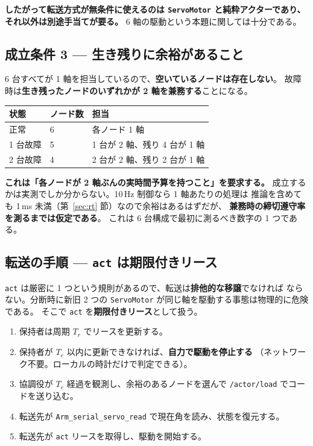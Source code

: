 \documentclass[11pt,a4paper]{article}
\newcommand{\code}[1]{\texttt{#1}}
\newcommand{\prob}[1]{\textbf{\textcolor{red!55!black}{#1}}}
\begin{document}
\textbf{したがって転送方式が無条件に使えるのは \code{ServoMotor} と純粋アクターであり、
それ以外は別途手当てが要る。} 6 軸の駆動という本題に関しては十分である。

\subsection{成立条件 3 --- 生き残りに余裕があること}

6 台すべてが 1 軸を担当しているので、\textbf{空いているノードは存在しない}。
故障時は\textbf{生き残ったノードのいずれかが 2 軸を兼務する}ことになる。

\begin{center}
\begin{tabular}{@{}l l l@{}}
\toprule
\textbf{状態} & \textbf{ノード数} & \textbf{担当}\\
\midrule
正常 & 6 & 各ノード 1 軸\\
1 台故障 & 5 & 1 台が 2 軸、残り 4 台が 1 軸\\
2 台故障 & 4 & 2 台が 2 軸、残り 2 台が 1 軸\\
\bottomrule
\end{tabular}
\end{center}

\prob{これは「各ノードが 2 軸ぶんの実時間予算を持つこと」を要求する。}
成立するかは実測でしか分からない。10\,Hz 制御なら 1 軸あたりの処理は
推論を含めても 1\,ms 未満（第~\ref{sec:rt} 節）なので余裕はあるはずだが、
\textbf{兼務時の締切遵守率を測るまでは仮定である}。
これは 6 台構成で最初に測るべき数字の 1 つである。

\subsection{転送の手順 --- \code{act} は期限付きリース}

\code{act} は厳密に 1 つという規則があるので、転送は\textbf{排他的な移譲}でなければ
ならない。分断時に新旧 2 つの \code{ServoMotor} が同じ軸を駆動する事態は物理的に危険である。
そこで \code{act} を\textbf{期限付きリース}として扱う。

\begin{enumerate}[leftmargin=1.6em,itemsep=3pt]
\item 保持者は周期 $T_r$ でリースを更新する。
\item 保持者が $T_e$ 以内に更新できなければ、\textbf{自力で駆動を停止する}
      （ネットワーク不要。ローカルの時計だけで判定できる）。
\item 協調役が $T_e$ 経過を観測し、余裕のあるノードを選んで
      \code{/actor/load} でコードを送り込む。
\item 転送先が \code{Arm\_serial\_servo\_read} で現在角を読み、状態を復元する。
\item 転送先が \code{act} リースを取得し、駆動を開始する。
\end{enumerate}
\end{document}
